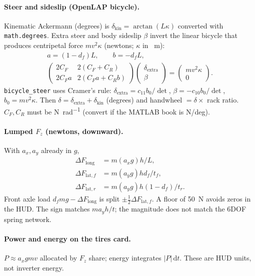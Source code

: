 \documentclass[11pt,letterpaper]{article}
\begin{document}
\paragraph{Steer and sideslip (OpenLAP bicycle).}
Kinematic Ackermann (degrees) is
$\delta_{\mathrm{kin}}=\arctan(L\kappa)$ converted with
\texttt{math.degrees}. Extra steer and body sideslip $\beta$ invert the
linear bicycle that produces centripetal force $m v^2\kappa$
(newtons; $\kappa$ in \si{\per\metre}):
\begin{gather}
  a=(1-d_f)L,\qquad b=-d_f L,\\
  \begin{pmatrix} 2C_F & 2(C_F+C_R)\\ 2 C_F a & 2(C_F a + C_R b)\end{pmatrix}
  \begin{pmatrix}\delta_{\mathrm{extra}}\\ \beta\end{pmatrix}
  =
  \begin{pmatrix} m v^2\kappa \\ 0 \end{pmatrix}.
\end{gather}
\texttt{bicycle\_steer} uses Cramer's rule:
$\delta_{\mathrm{extra}}=c_{11} b_0/\det$,
$\beta=-c_{10} b_0/\det$, $b_0=m v^2\kappa$. Then
$\delta=\delta_{\mathrm{extra}}+\delta_{\mathrm{kin}}$ (degrees) and
handwheel $=\delta\times$ rack ratio. $C_F,C_R$ must be
\si{\newton\per\radian} (convert if the MATLAB book is N/deg).

\paragraph{Lumped $F_z$ (newtons, downward).}
With $a_x,a_y$ already in $g$,
\begin{align}
  \Delta F_{\mathrm{long}} &= m (a_x g) h / L,\\
  \Delta F_{\mathrm{lat},f} &= m (a_y g) h d_f / t_f,\\
  \Delta F_{\mathrm{lat},r} &= m (a_y g) h (1-d_f) / t_r.
\end{align}
Front axle load $d_f m g - \Delta F_{\mathrm{long}}$ is split
$\pm\tfrac12\Delta F_{\mathrm{lat},f}$. A floor of \SI{50}{\newton}
avoids zeros in the HUD. The sign matches $m a_y h / t$; the magnitude
does not match the 6DOF spring network.

\paragraph{Power and energy on the tires card.}
$P \approx a_x g m v$ allocated by $F_z$ share; energy integrates
$|P|\,\mathrm{d}t$. These are HUD units, not inverter energy.
\end{document}
